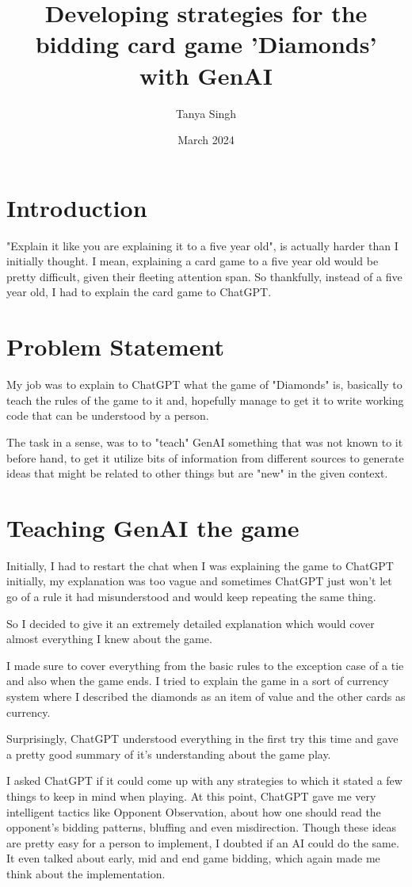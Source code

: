 \documentclass{article}
\title{Developing strategies for the bidding card game 'Diamonds' with GenAI}
\author{Tanya Singh}
\date{March 2024}
\begin{document}
\maketitle

\section{Introduction}
"Explain it like you are explaining it to a five year old", is actually harder than I initially thought. I mean, explaining a card game to a five year old would be pretty difficult, given their fleeting attention span. So thankfully, instead of a five year old, I had to explain the card game to ChatGPT.

\section{Problem Statement}
My job was to explain to ChatGPT what the game of "Diamonds" is, basically to teach the rules of the game to it and, hopefully manage to get it to write working code that can be understood by a person.

The task in a sense, was to to "teach" GenAI something that was not known to it before hand, to get it utilize bits of information from different sources to generate ideas that might be related to other things but are "new" in the given context. 


\section{Teaching GenAI the game}
Initially, I had to restart the chat  when I was explaining the game to ChatGPT initially, my explanation was too vague and sometimes ChatGPT just won't let go of a rule it had misunderstood and would keep repeating the same thing.

So I decided to give it an extremely detailed explanation which would cover almost everything I knew about the game.

I made sure to cover everything from the basic rules to the exception case of a tie and also when the game ends. I tried to explain the game in a sort of currency system where I described the diamonds as an item of value and the other cards as currency. 

Surprisingly, ChatGPT understood everything in the first try this time and gave a pretty good summary of it's understanding about the game play.

I asked ChatGPT if it could come up with any strategies to which it stated a few things to keep in mind when playing. At this point, ChatGPT gave me very intelligent tactics like Opponent Observation, about how one should read the opponent's bidding patterns, bluffing and even misdirection. Though these ideas are pretty easy for a person to implement, I doubted if an AI could do the same. It even talked about early, mid and end game bidding, which again made me think about the implementation. 
\end{document}
